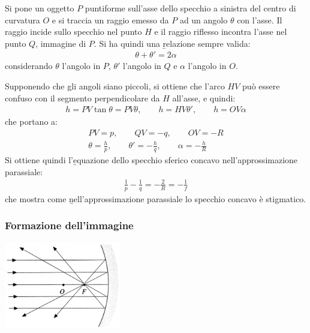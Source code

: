 Si pone un oggetto $P$ puntiforme sull'asse dello specchio a sinistra del centro di curvatura $O$ e si traccia un raggio emesso da $P$ ad un angolo $\theta$ con l'asse. Il raggio incide sullo specchio nel punto $H$ e il raggio riflesso incontra l'asse nel punto $Q$, immagine di $P$. Si ha quindi una \b{relazione sempre valida}:
\begin{equation}\begin{split}
\theta+\theta'=2\alpha
\end{split}\end{equation}
considerando $\theta$ l'angolo in $P$, $\theta'$ l'angolo in $Q$ e $\alpha$ l'angolo in $O$.

Supponendo che gli angoli siano piccoli, si ottiene che l'arco $HV$ può essere confuso con il segmento perpendicolare da $H$ all'asse, e quindi:
\begin{equation}\begin{split}
h=PV\tan{\theta}=PV\theta, \qquad h=HV\theta', \qquad h=OV\alpha
\end{split}\end{equation}
che portano a:
\begin{equation}\begin{split}
PV=p, \qquad QV=-q, \qquad OV=-R\\
\theta=\frac{h}{p}, \qquad \theta'=-\frac{h}{q}, \qquad \alpha=-\frac{h}{R}
\end{split}\end{equation}
Si ottiene quindi l'\b{equazione dello specchio sferico concavo nell'approssimazione parassiale}:
\begin{equation}\begin{split}
\frac{1}{p}-\frac{1}{q}=-\frac{2}{R}=-\frac{1}{f}
\end{split}\end{equation}
che mostra come \b{nell'approssimazione parassiale lo specchio concavo è stigmatico}.

\subsubsection{Formazione dell'immagine}
\begin{center}
\includegraphics[width=2in]{immagini/specchi2.jpg}
\end{center}

